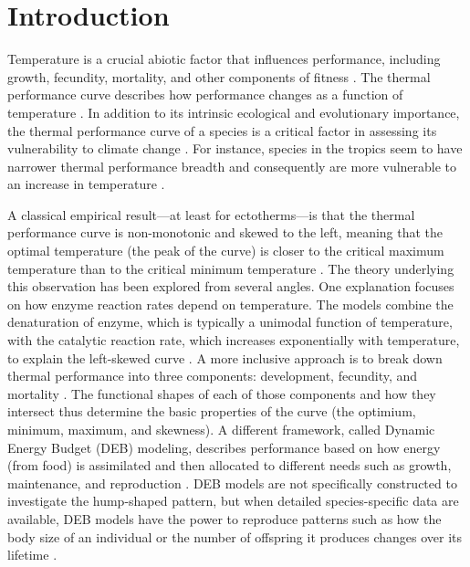 \section*{Introduction}

Temperature is a crucial abiotic factor that influences performance, including growth, fecundity, mortality, and other components of fitness \citep{Birch1953,Angilletta2002,Huey1979,Savage2004}.
The thermal performance curve describes how performance changes as a function of temperature \citep{Huey1979,Angilletta2009, Amarasekare2012}.
In addition to its intrinsic ecological and evolutionary importance, the thermal performance curve of a species is a critical factor in assessing its vulnerability to climate change \citep{Calosi2008,Deutsch2008,Kingsolver2011}.
For instance, species in the tropics seem to have narrower thermal performance breadth and consequently are more vulnerable to an increase in temperature \citep{Deutsch2008}.

A classical empirical result---at least for ectotherms---is that the thermal performance curve is non-monotonic and skewed to the left, meaning that the optimal temperature (the peak of the curve) is closer to the critical maximum temperature than to the critical minimum temperature \citep{Barlow1962,Huey2001,Angilletta2009}.
The theory underlying this observation has been explored from several angles.
One explanation focuses on how enzyme reaction rates depend on temperature.
The models combine the denaturation of enzyme, which is typically a unimodal function of temperature, with the catalytic reaction rate, which increases exponentially with temperature, to explain the left-skewed curve \citep{VandH1996, VandH2002, Ratkowsky2005, Kingsolver2009}.
A more inclusive approach is to break down thermal performance into three components: development, fecundity, and mortality \citep{Amarasekare2012}.
The functional shapes of each of those components and how they intersect thus determine the basic properties of the curve (the optimium, minimum, maximum, and skewness).
A different framework, called Dynamic Energy Budget (DEB) modeling, describes performance based on how energy (from food) is assimilated and then allocated to different needs such as growth, maintenance, and reproduction \citep{Kooijman2009}.
DEB models are not specifically constructed to investigate the hump-shaped pattern, but when detailed species-specific data are available, DEB models have the power to reproduce patterns such as how the body size of an individual or the number of offspring it produces changes over its lifetime \citep{Nisbet2000}.

